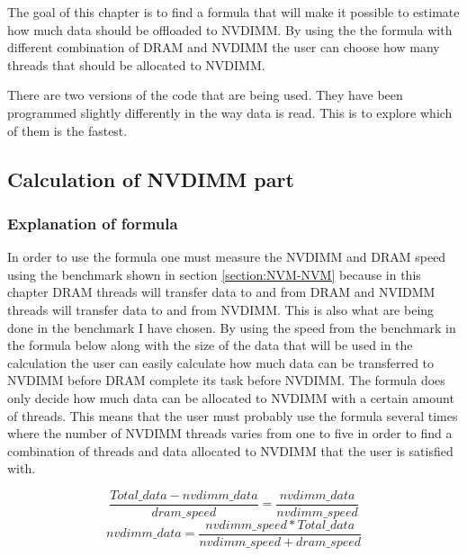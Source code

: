 \documentclass[12pt,a4paper,USenglish]{article}      %
\begin{document}
The goal of this chapter is to find a formula that will make it possible to estimate how much data should be offloaded to NVDIMM. By using the the formula with different combination of DRAM and NVDIMM the user can choose how many threads that should be allocated to NVDIMM.

There are two versions of the code that are being used. They have been programmed slightly differently in the way data is read. This is to explore which of them is the fastest.


\subsection{Calculation of NVDIMM part}
\subsubsection{Explanation of formula}
In order to use the formula one must measure the NVDIMM and DRAM speed using the benchmark shown in section \ref{section:NVM-NVM} because in this chapter DRAM threads will transfer data to and from DRAM and NVIDMM threads will transfer data to and from NVDIMM. This is also what are being done in the benchmark I have chosen.
By using the speed from the benchmark in the formula below along with the size of the data that will be used in the calculation the user can easily calculate how much data can be transferred to NVDIMM before DRAM complete its task before NVDIMM. The formula does only decide how much data can be allocated to NVDIMM with a certain amount of threads. This means that the user must probably use the formula several times where the number of NVDIMM threads varies from one to five in order to find a combination of threads and data allocated to NVDIMM that the user is satisfied with. 

\begin{equation}
    \frac{Total\_data-nvdimm\_data}{dram\_speed} = \frac{nvdimm\_data}{nvdimm\_speed}
\end{equation}
\begin{equation}
    nvdimm\_data = \frac{nvdimm\_speed*Total\_data}{nvdimm\_speed+dram\_speed}
\end{equation}
\end{document}
